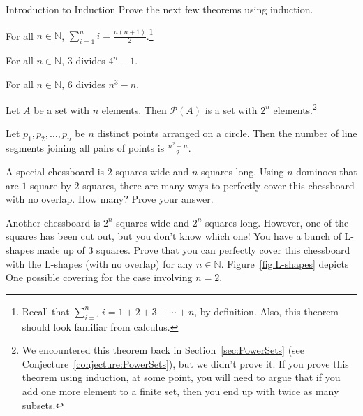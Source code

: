 \begin{section}{Introduction to Induction}
Prove the next few theorems using induction.

\begin{theorem}
For all $n\in\mathbb{N}$, $\displaystyle \sum_{i=1}^{n}i=\frac{n(n+1)}{2}$.\footnote{Recall that $\displaystyle \sum_{i=1}^{n}i=1+2+3+\cdots +n$, by definition.  Also, this theorem should look familiar from calculus.}
\end{theorem}

\begin{theorem}
For all $n\in\mathbb{N}$, 3 divides $4^{n}-1$.
\end{theorem}

\begin{theorem}
For all $n\in\mathbb{N}$, 6 divides $n^{3}-n$.
\end{theorem}

\begin{theorem}
Let $A$ be a set with $n$ elements.  Then $\mathcal{P}(A)$ is a set with $2^{n}$ elements.\footnote{We encountered this theorem back in Section~\ref{sec:PowerSets} (see Conjecture~\ref{conjecture:PowerSets}), but we didn't prove it. If you prove this theorem using induction, at some point, you will need to argue that if you add one more element to a finite set, then you end up with twice as many subsets.}
\end{theorem}

\begin{theorem}
Let $p_{1}, p_{2}, \ldots, p_{n}$ be $n$ distinct points arranged on a circle.  Then the number of line segments joining all pairs of points is $\frac{n^{2}-n}{2}$.
\end{theorem}

\begin{problem}
A special chessboard is $2$ squares wide and $n$ squares long.  Using $n$ dominoes that are $1$ square by $2$ squares, there are many ways to perfectly cover this chessboard with no overlap.  How many?  Prove your answer.
\end{problem}

\begin{problem}\label{prob:L-shapes}
Another chessboard is $2^n$ squares wide and $2^n$ squares long.  However, one of the squares has been cut out, but you don't know which one!  You have a bunch of L-shapes made up of $3$ squares.  Prove that you can perfectly cover this chessboard with the L-shapes (with no overlap) for any $n\in\mathbb{N}$. Figure~\ref{fig:L-shapes} depicts One possible covering for the case involving $n=2$.
\end{problem}


\end{section}
